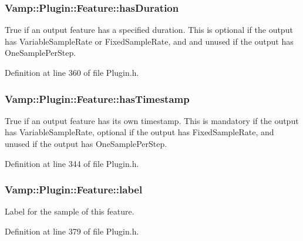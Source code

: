 \subsubsection[{\texorpdfstring{has\+Duration}{hasDuration}}]{ Vamp\+::\+Plugin\+::\+Feature\+::has\+Duration}\hypertarget{struct_vamp_1_1_plugin_1_1_feature_a33686757bd4481c72494122e9bfb9fba}{}\label{struct_vamp_1_1_plugin_1_1_feature_a33686757bd4481c72494122e9bfb9fba}
True if an output feature has a specified duration. This is optional if the output has Variable\+Sample\+Rate or Fixed\+Sample\+Rate, and and unused if the output has One\+Sample\+Per\+Step. 

Definition at line 360 of file Plugin.\+h.

\subsubsection[{\texorpdfstring{has\+Timestamp}{hasTimestamp}}]{ Vamp\+::\+Plugin\+::\+Feature\+::has\+Timestamp}\hypertarget{struct_vamp_1_1_plugin_1_1_feature_a98907091d0b6a589720ae35ae588a82b}{}\label{struct_vamp_1_1_plugin_1_1_feature_a98907091d0b6a589720ae35ae588a82b}
True if an output feature has its own timestamp. This is mandatory if the output has Variable\+Sample\+Rate, optional if the output has Fixed\+Sample\+Rate, and unused if the output has One\+Sample\+Per\+Step. 

Definition at line 344 of file Plugin.\+h.

\subsubsection[{\texorpdfstring{label}{label}}]{ Vamp\+::\+Plugin\+::\+Feature\+::label}\hypertarget{struct_vamp_1_1_plugin_1_1_feature_a8eb1fb35f73b247ed13de9527c18f036}{}\label{struct_vamp_1_1_plugin_1_1_feature_a8eb1fb35f73b247ed13de9527c18f036}
Label for the sample of this feature. 

Definition at line 379 of file Plugin.\+h.

